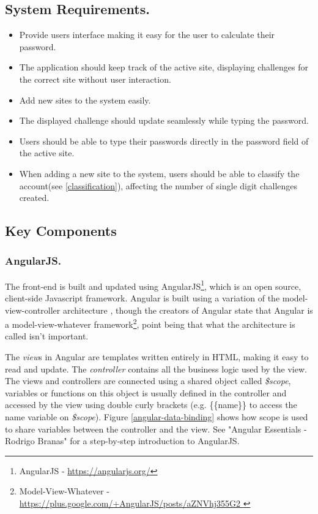 \subsection{System Requirements.}
\begin{itemize}
    \item Provide users interface making it easy for the user to calculate their password.
    \item The application should keep track of the active site, displaying challenges for the correct site without user interaction.
    \item Add new sites to the system easily. 
    \item The displayed challenge should update seamlessly while typing the password.
    \item Users should be able to type their passwords directly in the password field of the active site.
    \item When adding a new site to the system, users should be able to classify the account(see \autoref{classification}), affecting the number of single digit challenges created.
\end{itemize}



\subsection{Key Components}

\subsubsection{AngularJS.} The front-end is built and updated using AngularJS\footnote{AngularJS - \url{https://angularjs.org/}}, which is an open source, client-side Javascript framework. Angular is built using a variation of the model-view-controller architecture \cite{mvc}, though the creators of Angular state that Angular is a model-view-whatever framework\footnote{Model-View-Whatever - \url{ https://plus.google.com/+AngularJS/posts/aZNVhj355G2 }}, point being that what the architecture is called isn't important. 
\par The \emph{view}s in Angular are templates written entirely in HTML, making it easy to read and update. The \emph{controller} contains all the business logic used by the view. The views and controllers are connected using a shared object called \emph{\$scope}, variables or functions on this object is usually defined in the controller and accessed by the view using double curly brackets (e.g. \{\{name\}\} to access the name variable on \emph{\$scope}). Figure \ref{angular-data-binding} shows how scope is used to share variables between the controller and the view. 
See "Angular Essentials - Rodrigo Branas"\cite{angularjs-book} for a step-by-step introduction to AngularJS.

